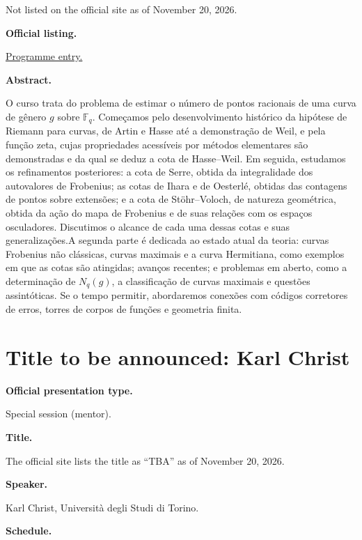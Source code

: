 Not listed on the official site as of
November 20, 2026.

\medskip\noindent
{\bf Official listing.}

\href{%
https://sites.google.com/view/%
geoalgcompluff/legal/%
legal-2027-resumos#h.6f5k7zdb7c47%
}{Programme entry.}

\medskip\noindent
{\bf Abstract.}

O curso trata do problema de estimar o número
de pontos racionais de uma curva de gênero
$g$ sobre $\mathbb F_q$. Começamos pelo
desenvolvimento histórico da hipótese de
Riemann para curvas, de Artin e Hasse até a
demonstração de Weil, e pela função zeta,
cujas propriedades acessíveis por métodos
elementares são demonstradas e da qual se
deduz a cota de Hasse–Weil. Em seguida,
estudamos os refinamentos posteriores: a cota
de Serre, obtida da integralidade dos
autovalores de Frobenius; as cotas de Ihara e
de Oesterlé, obtidas das contagens de pontos
sobre extensões; e a cota de Stöhr–Voloch, de
natureza geométrica, obtida da ação do mapa
de Frobenius e de suas relações com os
espaços osculadores. Discutimos o alcance de
cada uma dessas cotas e suas generalizações.A
segunda parte é dedicada ao estado atual da
teoria: curvas Frobenius não clássicas,
curvas maximais e a curva Hermitiana, como
exemplos em que as cotas são atingidas;
avanços recentes; e problemas em aberto, como
a determinação de $N_q(g)$, a classificação
de curvas maximais e questões assintóticas.
Se o tempo permitir, abordaremos conexões com
códigos corretores de erros, torres de corpos
de funções e geometria finita.

\section{Title to be announced: Karl Christ}
\label{section-tba-christ}

\medskip\noindent
{\bf Official presentation type.}

Special session (mentor).

\medskip\noindent
{\bf Title.}

The official site lists the title as
``TBA'' as of November 20, 2026.

\medskip\noindent
{\bf Speaker.}

Karl Christ, Università degli Studi di
Torino.

\medskip\noindent
{\bf Schedule.}

